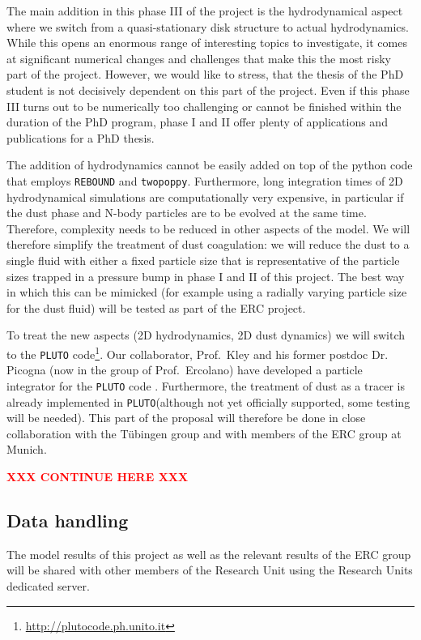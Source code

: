 \documentclass[10pt,fleqn,twoside]{article}
\newcommand{\missing}[1]{\textcolor{red}{\textbf{XXX #1 XXX}}}
\newcommand{\twopoppy}{\texttt{twopoppy}\xspace}
\newcommand{\rebound}{\texttt{REBOUND}\xspace}
\newcommand{\pluto}{\texttt{PLUTO}\xspace}
\begin{document}
The main addition in this phase III of the project is the
hydrodynamical aspect where we switch from a quasi-stationary disk
structure to actual hydrodynamics. While this opens an enormous range
of interesting topics to investigate, it comes at significant
numerical changes and challenges that make this the most risky part of
the project. However, we would like to stress, that the thesis of the
PhD student is not decisively dependent on this part of the project.
Even if this phase III turns out to be numerically too challenging or
cannot be finished within the duration of the PhD program, phase I and
II offer plenty of applications and publications for a PhD thesis.

The addition of hydrodynamics cannot be easily added on top of the
python code that employs \rebound and \twopoppy. Furthermore, long
integration times of 2D hydrodynamical simulations are computationally
very expensive, in particular if the dust phase and N-body particles
are to be evolved at the same time. Therefore, complexity needs to be
reduced in other aspects of the model. We will therefore simplify the
treatment of dust coagulation: we will reduce the dust to a single
fluid with either a fixed particle size that is representative of the
particle sizes trapped in a pressure bump in phase I and II of this
project. The best way in which this can be mimicked (for example using
a radially varying particle size for the dust fluid) will be tested as
part of the ERC project.

To treat the new aspects (2D hydrodynamics, 2D dust dynamics) we will
switch to the \pluto
code\footnote{\url{http://plutocode.ph.unito.it}}. Our collaborator,
Prof.~Kley and his former postdoc Dr. Picogna (now in the group of
Prof.~Ercolano) have developed a particle integrator for the \pluto
code \citep[see][]{2015A&A...584A.110P}. Furthermore, the treatment of
dust as a tracer is already implemented in \pluto (although not yet
officially supported, some testing will be needed). This part of the
proposal will therefore be done in close collaboration with the
Tübingen group and with members of the ERC group at Munich.

\missing{CONTINUE HERE}


\subsection{Data handling}

The model results of this project as well as the relevant results of
the ERC group will be shared with other members of the Research Unit
using the Research Units dedicated server.
\end{document}
